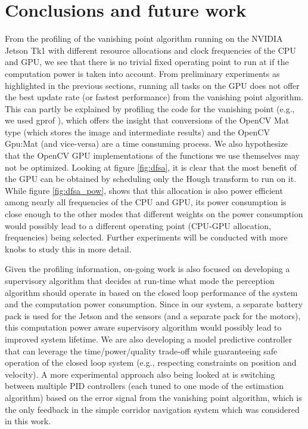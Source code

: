 \section{Conclusions and future work}

From the profiling of the vanishing point algorithm running on the NVIDIA Jetson Tk1 with different resource allocations and clock frequencies of the CPU and GPU, we see that there is no trivial fixed operating point to run at if the computation power is taken into account. From preliminary experiments as highlighted in the previous sections, running all tasks on the GPU does not offer the best update rate (or fastest performance) from the vanishing point algorithm. This can partly be explained by profiling the code for the vanishing point (e.g., we used gprof \cite{Graham:1982:GCG:800230.806987}), which offers the insight that conversions of the OpenCV Mat type (which stores the image and intermediate results) and the OpenCV Gpu:Mat (and vice-versa) are a time consuming process. We also hypothesize that the OpenCV GPU implementations of the functions we use themselves may not be optimized. Looking at figure \ref{fig:dfsa}, it is clear that the most benefit of the GPU can be obtained by scheduling only the Hough transform to run on it. While figure \ref{fig:dfsa_pow}, shows that this allocation is also power efficient among nearly all frequencies of the CPU and GPU, its power consumption is close enough to the other modes that different weights on the power consumption would possibly lead to a different operating point (CPU-GPU allocation, frequencies) being selected. Further experiments will be conducted with more knobs to study this in more detail.

Given the profiling information, on-going work is also focused on developing a supervisory algorithm that decides at run-time what mode the perception algorithm should operate in based on the closed loop performance of the system and the computation power consumption. Since in our system, a separate battery pack is used for the Jetson and the sensors (and a separate pack for the motors), this computation power aware supervisory algorithm would possibly lead to improved system lifetime. We are also developing a model predictive controller that can leverage the time/power/quality trade-off while guaranteeing safe operation of the closed loop system (e.g., respecting constraints on position and velocity). A more experimental approach also being looked at is switching between multiple PID controllers (each tuned to one mode of the estimation algorithm) based on the error signal from the vanishing point algorithm, which is the only feedback in the simple corridor navigation system which was considered in this work.
